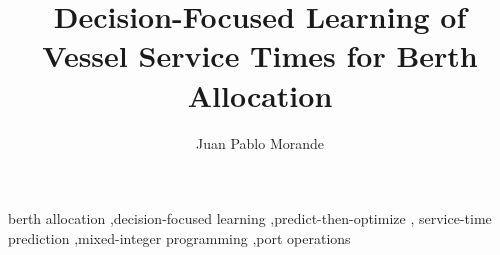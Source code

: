 \documentclass[review]{elsarticle}
\newcommand{\todo}[1]{\textcolor{red}{[\textbf{TODO:} #1]}}
\begin{document}
\begin{frontmatter}

\title{Decision-Focused Learning of Vessel Service Times for Berth Allocation}

\author[auburn]{Juan Pablo Morande}

\begin{abstract}

\end{abstract}

\begin{keyword}
berth allocation \sep decision-focused learning \sep predict-then-optimize \sep
service-time prediction \sep mixed-integer programming \sep port operations
\end{keyword}

\end{frontmatter}











\end{document}
